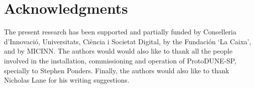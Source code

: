 \section{Acknowledgments}
The present research has been supported and partially funded by Conselleria d’Innovació, Universitats, Ciència i Societat Digital, by the Fundación `La Caixa', and by MICINN. The authors would would also like to thank all the people involved in the installation, commissioning and operation of ProtoDUNE-SP, specially to Stephen Ponders. Finally, the authors would also like to thank Nicholas Lane for his writing suggestions. 